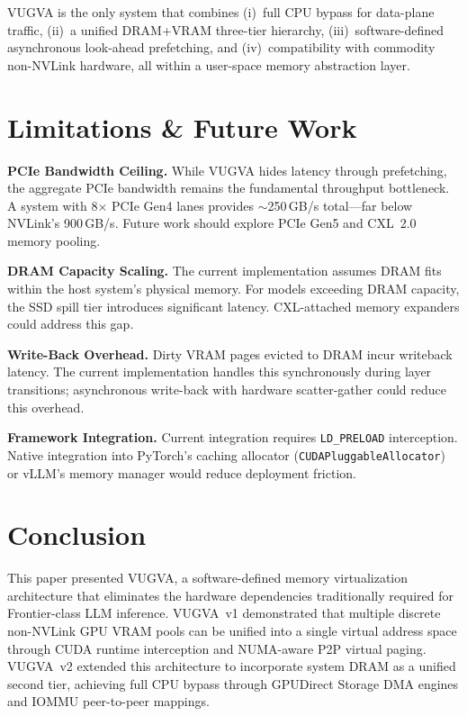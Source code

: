 \documentclass[11pt,twocolumn]{article}
\begin{document}
VUGVA is the only system that combines (i)~full CPU bypass for data-plane traffic, (ii)~a unified DRAM+VRAM three-tier hierarchy, (iii)~software-defined asynchronous look-ahead prefetching, and (iv)~compatibility with commodity non-NVLink hardware, all within a user-space memory abstraction layer.

\section{Limitations \& Future Work}
\label{sec:limitations}

\textbf{PCIe Bandwidth Ceiling.} While VUGVA hides latency through prefetching, the aggregate PCIe bandwidth remains the fundamental throughput bottleneck. A system with 8$\times$ PCIe Gen4 lanes provides $\sim$250\,GB/s total---far below NVLink's 900\,GB/s. Future work should explore PCIe Gen5 and CXL~2.0 memory pooling.

\textbf{DRAM Capacity Scaling.} The current implementation assumes DRAM fits within the host system's physical memory. For models exceeding DRAM capacity, the SSD spill tier introduces significant latency. CXL-attached memory expanders could address this gap.

\textbf{Write-Back Overhead.} Dirty VRAM pages evicted to DRAM incur writeback latency. The current implementation handles this synchronously during layer transitions; asynchronous write-back with hardware scatter-gather could reduce this overhead.

\textbf{Framework Integration.} Current integration requires \texttt{LD\_PRELOAD} interception. Native integration into PyTorch's caching allocator (\texttt{CUDAPluggableAllocator}) or vLLM's memory manager would reduce deployment friction.

\section{Conclusion}
\label{sec:conclusion}

This paper presented VUGVA, a software-defined memory virtualization architecture that eliminates the hardware dependencies traditionally required for Frontier-class LLM inference. VUGVA~v1 demonstrated that multiple discrete non-NVLink GPU VRAM pools can be unified into a single virtual address space through CUDA runtime interception and NUMA-aware P2P virtual paging. VUGVA~v2 extended this architecture to incorporate system DRAM as a unified second tier, achieving full CPU bypass through GPUDirect Storage DMA engines and IOMMU peer-to-peer mappings.
\end{document}
